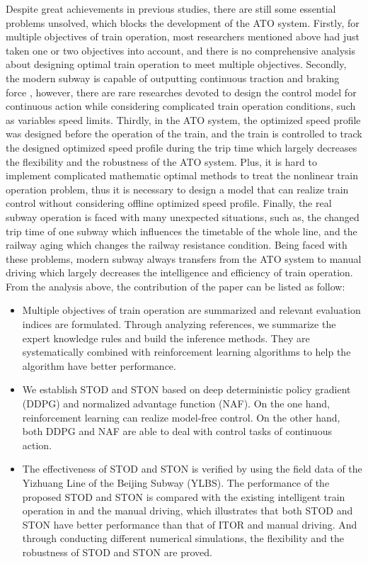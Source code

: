 \documentclass[journal]{IEEEtran}
\begin{document}
\par Despite great achievements in previous studies, there are still some essential problems unsolved, which blocks the development of the ATO system. Firstly, for multiple objectives of train operation, most researchers mentioned above had just taken one or two objectives into account, and there is no comprehensive analysis about designing optimal train operation to meet multiple objectives. Secondly, the modern subway is capable of outputting continuous traction and braking force \cite{liu2003energy}, however, there are rare researches devoted to design the control model for continuous action while considering complicated train operation conditions, such as variables speed limits. Thirdly, in the ATO system, the optimized speed profile was designed before the operation of the train, and the train is controlled to track the designed optimized speed profile during the trip time which largely decreases the flexibility and the robustness of the ATO system. Plus, it is hard to implement complicated mathematic optimal methods to treat the nonlinear train operation problem, thus it is necessary to design a model that can realize train control without considering offline optimized speed profile. Finally, the real subway operation is faced with many unexpected situations, such as, the changed trip time of one subway which influences the timetable of the whole line, and the railway aging which changes the railway resistance condition. Being faced with these problems, modern subway always transfers from the ATO system to manual driving which largely decreases the intelligence and efficiency of train operation. From the analysis above, the contribution of the paper can be listed as follow:
\begin{itemize}
 	\item Multiple objectives of train operation are summarized and relevant evaluation indices are formulated. Through analyzing references, we summarize the expert knowledge rules and build the inference methods. They are systematically combined with reinforcement learning algorithms to help the algorithm have better performance.
 	
 	\item We establish STOD and STON based on deep deterministic policy gradient (DDPG) and normalized advantage function (NAF). On the one hand, reinforcement learning can realize model-free control. On the other hand, both DDPG and NAF are able to deal with control tasks of continuous action.
 	
 	\item The effectiveness of STOD and STON is verified by using the field data of the Yizhuang Line of the Beijing Subway (YLBS). The performance of the proposed STOD and STON is compared with the existing intelligent train operation in \cite{yin2014intelligent} and the manual driving, which illustrates that both STOD and STON have better performance than that of ITOR and manual driving. And through conducting different numerical simulations, the flexibility and the robustness of STOD and STON are proved.
 	
\end{itemize}
\end{document}
